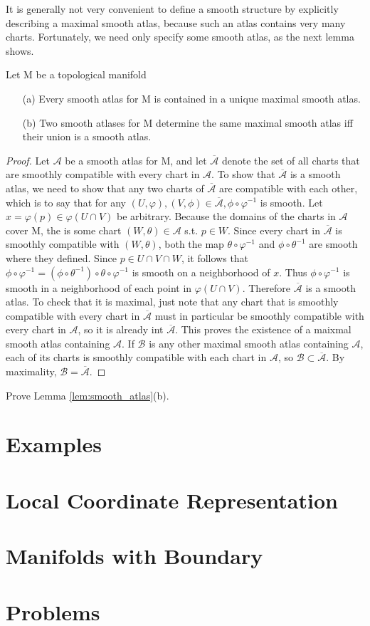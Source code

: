 It is generally not very convenient to define a smooth structure by explicitly describing a
maximal smooth atlas, because such an atlas contains very many charts. Fortunately, we need
only specify some smooth atlas, as the next lemma shows.
\begin{lem}\label{lem:smooth_atlas}
Let M be a topological manifold
\begin{enumerate}
\item[(a)] Every smooth atlas for M is contained in a unique maximal smooth atlas.
\item[(b)] Two smooth atlases for M determine the same maximal smooth atlas iff their union is
a smooth atlas.
\end{enumerate}
\end{lem}
\begin{proof}
Let $\mathcal{A}$ be a smooth atlas for M, and let $\overline{\mathcal{A}}$ denote the 
set of all charts that are smoothly compatible with every chart in $\mathcal{A}$. To 
show that $\overline{\mathcal{A}}$ is a smooth atlas, we need to show that any two
charts of $\overline{\mathcal{A}}$ are compatible with each other, which is to say that
for any $(U,\varphi),(V,\phi)\in \overline{\mathcal{A}}, \phi\circ\varphi^{-1}$ is
smooth. Let $x=\varphi(p)\in \varphi(U\cap V)$ be arbitrary. Because the domains of the
charts in $\mathcal{A}$ cover M, the is some chart $(W,\theta)\in \mathcal{A}$ s.t. 
$p\in W$. Since every chart in $\overline{\mathcal{A}}$ is smoothly compatible with 
$(W,\theta)$, both the map $\theta\circ\varphi^{-1}$ and $\phi\circ\theta^{-1}$ are 
smooth where they defined. Since $p\in U\cap V \cap W$, it follows that $\phi\circ\varphi^{-1}
=(\phi\circ\theta^{-1})\circ\theta\circ\varphi^{-1}$ is smooth on a neighborhood of $x$.
Thus $\phi\circ\varphi^{-1}$ is smooth in a neighborhood of each point in $\varphi(U\cap V)$.
Therefore $\overline{\mathcal{A}}$ is a smooth atlas. To check that it is maximal, just
note that any chart that is smoothly compatible with every chart in $\overline{\mathcal{A}}$
must in particular be smoothly compatible with every chart in $\mathcal{A}$, so it is already
int $\overline{\mathcal{A}}$. This proves the existence of a maixmal smooth atlas containing
$\mathcal{A}$. If $\mathcal{B}$ is any other maximal smooth atlas containing $\mathcal{A}$,
each of its charts is smoothly compatible with each chart in $\mathcal{A}$, so $\mathcal{B}\subset
\overline{\mathcal{A}}$. By maximality, $\mathcal{B}=\overline{\mathcal{A}}$.
\end{proof}
\begin{exer}
Prove Lemma \ref{lem:smooth_atlas}(b).
\end{exer}
\section{Examples}
\section{Local Coordinate Representation}
\section{Manifolds with Boundary}
\section{Problems}